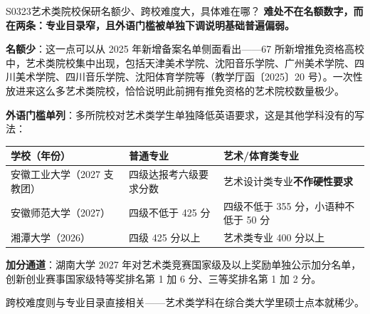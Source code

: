 \begin{qa}{S0323}{艺术类院校保研名额少、跨校难度大，具体难在哪？}
\textbf{难处不在名额数字，而在两条：专业目录窄，且外语门槛被单独下调说明基础普遍偏弱。}

\textbf{名额少}：这一点可以从 2025 年新增备案名单侧面看出——67 所新增推免资格高校中，艺术类院校集中出现，包括天津美术学院、沈阳音乐学院、广州美术学院、四川美术学院、四川音乐学院、沈阳体育学院等（教学厅函〔2025〕20 号）。一次性放进来这么多艺术类院校，恰恰说明此前拥有推免资格的艺术院校数量极少。

\textbf{外语门槛单列}：多所院校对艺术类学生单独降低英语要求，这是其他学科没有的写法：

\par\vspace{2pt}\nobreak\begin{center}\footnotesize
\begin{tabularx}{\textwidth}{>{\raggedright\arraybackslash}X>{\raggedright\arraybackslash}X>{\raggedright\arraybackslash}X}
\toprule
\textbf{学校（年份）} & \textbf{普通专业} & \textbf{艺术/体育类专业} \\ \midrule
安徽工业大学（2027 支教团） & 四级达报考六级要求分数 & 艺术设计类专业\textbf{不作硬性要求} \\
安徽师范大学（2027） & 四级不低于 425 分 & 四级不低于 355 分，小语种不低于 50 分 \\
湘潭大学（2026） & 四级 425 分以上 & 艺术类专业 400 分以上 \\
\bottomrule
\end{tabularx}
\end{center}\vspace{2pt}\par

\textbf{加分通道}：湖南大学 2027 年对艺术类竞赛国家级及以上奖励单独公示加分名单，创新创业赛事国家级特等奖排名第 1 加 6 分、三等奖排名第 1 加 2 分。

跨校难度则与专业目录直接相关——艺术类学科在综合类大学里硕士点本就稀少。
\end{qa}

